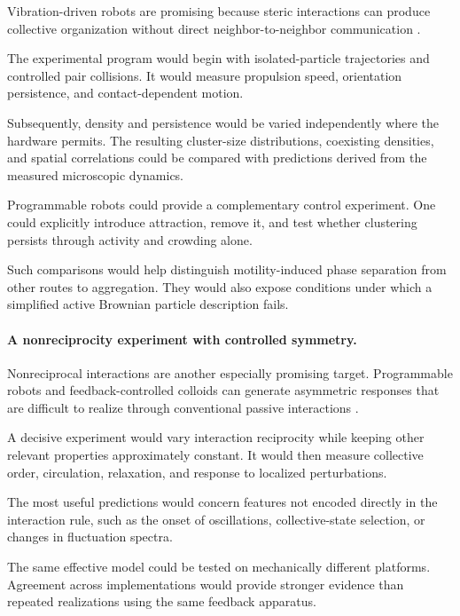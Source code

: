 Vibration-driven robots are promising
because steric interactions can produce
collective organization without direct
neighbor-to-neighbor communication
\cite{Welch2018aggregatesuppressio,Welch2019activereorientation,Deblais2019howtoforceanarmy,Boudet2025nonmarkoviandynami,Luo2025flockingphasesepar}.

The experimental program would begin
with isolated-particle trajectories
and controlled pair collisions.
It would measure propulsion speed,
orientation persistence, and
contact-dependent motion.

Subsequently, density and persistence
would be varied independently where
the hardware permits. The resulting
cluster-size distributions,
coexisting densities, and
spatial correlations could be
compared with predictions derived
from the measured microscopic
dynamics.

Programmable robots could provide
a complementary control experiment.
One could explicitly introduce
attraction, remove it, and test
whether clustering persists
through activity and crowding
alone.

Such comparisons would help distinguish
motility-induced phase separation
from other routes to aggregation.
They would also expose conditions
under which a simplified active
Brownian particle description fails.

\paragraph*{A nonreciprocity experiment with controlled symmetry.}

Nonreciprocal interactions are another
especially promising target.
Programmable robots and feedback-controlled
colloids can generate asymmetric
responses that are difficult to
realize through conventional
passive interactions
\cite{Fruchart2022nonreciprocalphase,Buerle2020formationofstable,Chen2022collectiveresponse,Chen2024persistentandrespo}.

A decisive experiment would vary
interaction reciprocity while keeping
other relevant properties approximately
constant. It would then measure
collective order, circulation,
relaxation, and response to
localized perturbations.

The most useful predictions would
concern features not encoded directly
in the interaction rule, such as
the onset of oscillations,
collective-state selection,
or changes in fluctuation spectra.

The same effective model could be
tested on mechanically different
platforms. Agreement across
implementations would provide
stronger evidence than repeated
realizations using the same
feedback apparatus.

